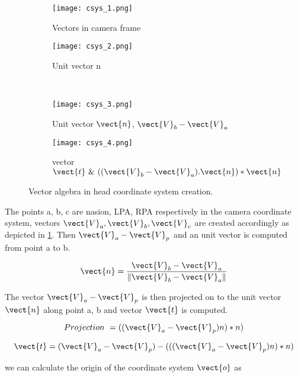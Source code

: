 \begin{figure}[hbt!]
\centering
	\begin{subfigure}{0.35\textwidth}
		\texttt{[image: csys\_1.png]}
		\caption{Vectors in camera frame}
		\label{fig:csys_1}	
	\end{subfigure}
	\begin{subfigure}{0.35\textwidth}
		\texttt{[image: csys\_2.png]}
		\caption{Unit vector n}
		\label{fig:csys_2}	
	\end{subfigure}
	\\
	\begin{subfigure}{0.35\textwidth}
		\texttt{[image: csys\_3.png]}
		\caption{Unit vector $\vect{n}$, $\vect{V}_b - \vect{V}_a$ }
		\label{fig:csys_3}	
	\end{subfigure}
	\begin{subfigure}{0.35\textwidth}
		\texttt{[image: csys\_4.png]}
		\caption{vector $\vect{t}\  \&\  ((\vect{V}_b - \vect{V}_a).\vect{n})*\vect{n} $}
		\label{fig:csys_4}	
	\end{subfigure}
\caption{Vector algebra in head coordinate system creation.} 
\label{fig:BTi_4D_3}
\end{figure} 

The points a, b, c are nasion, LPA, RPA respectively in the camera coordinate system, vectors $ \vect{V}_a, \vect{V}_b, \vect{V}_c $ are created accordingly as depicted in \ref{fig:csys_1}. Then $\vect{V}_a - \vect{V}_p$ and an unit vector is computed from point a to b.

\begin{equation*}
\vect{n} = \frac{ {\vect{V}_{b} - \vect{V}_{a} } } {\| {\vect{V}_{b} - \vect{V}_{a} \|} }
\end{equation*}

\noindent The vector $\vect{V}_a - \vect{V}_p$ is then projected on to the unit vector $\vect{n}$ along point a, b and vector $\vect{t}$ is computed.

\begin{equation*}
Projection\  = ((\vect{V}_a - \vect{V}_p)n)*n)
\end{equation*}

\begin{equation*}
\vect{t} = (\vect{V}_a - \vect{V}_p) - (((\vect{V}_a - \vect{V}_p)n)*n)
\end{equation*}

we can calculate the origin of the coordinate system $ \vect{o} $ as 

